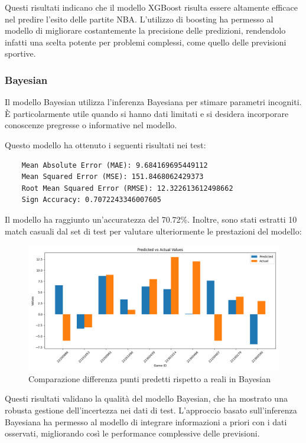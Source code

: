 Questi risultati indicano che il modello XGBoost risulta essere altamente efficace nel predire l'esito delle partite NBA. L'utilizzo di boosting ha permesso al modello di migliorare costantemente la precisione delle predizioni, rendendolo infatti una scelta potente per problemi complessi, come quello delle previsioni sportive.


\subsubsection{Bayesian}

Il modello Bayesian utilizza l'inferenza Bayesiana per stimare parametri incogniti. È particolarmente utile quando si hanno dati limitati e si desidera incorporare conoscenze pregresse o informative nel modello.

Questo modello ha ottenuto i seguenti risultati nei test:

\begin{lstlisting}
    Mean Absolute Error (MAE): 9.684169695449112
    Mean Squared Error (MSE): 151.8468062429373
    Root Mean Squared Error (RMSE): 12.322613612498662
    Sign Accuracy: 0.7072243346007605
\end{lstlisting}

Il modello ha raggiunto un'accuratezza del 70.72\%. Inoltre, sono stati estratti 10 match casuali dal set di test per valutare ulteriormente le prestazioni del modello:

\begin{figure}[H]
    \centering
    \includegraphics[width=0.7\linewidth]{img/bayesian_istogramma.png}
    \caption{Comparazione differenza punti predetti rispetto a reali in Bayesian}
    \label{fig:enter-label}
\end{figure}

Questi risultati validano la qualità del modello Bayesian, che ha mostrato una robusta gestione dell'incertezza nei dati di test. L'approccio basato sull'inferenza Bayesiana ha permesso al modello di integrare informazioni a priori con i dati osservati, migliorando così le performance complessive delle previsioni.


